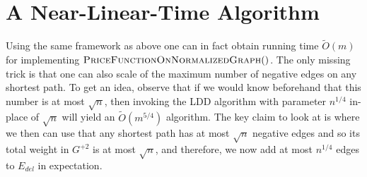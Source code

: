 \section{A Near-Linear-Time Algorithm}

Using the same framework as above one can in fact obtain running time $\tilde{O}(m)$ for implementing  $\textsc{PriceFunctionOnNormalizedGraph}()$. The only missing trick is that one can also scale of the maximum number of negative edges on any shortest path. To get an idea, observe that if we would know beforehand that this number is at most $\sqrt{n}$, then invoking the LDD algorithm with parameter $n^{1/4}$ in-place of $\sqrt{n}$ will yield an $\tilde{O}(m^{5/4})$ algorithm. The key claim to look at is  where we then can use that any shortest path has at most $\sqrt{n}$ negative edges and so its total weight in $G^{+2}$ is at most $\sqrt{n}$, and therefore, we now add at most $n^{1/4}$ edges to $E_{del}$ in expectation. 